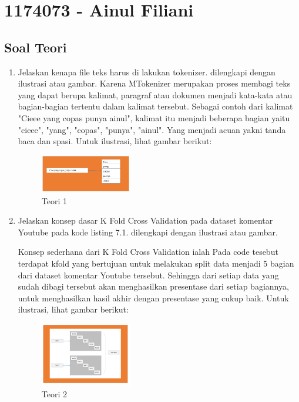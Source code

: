 \section{1174073 - Ainul Filiani}
\subsection{Soal Teori}
\begin{enumerate}

	\item Jelaskan kenapa file teks harus di lakukan tokenizer. dilengkapi dengan ilustrasi atau gambar.
	\hfill\break
	Karena MTokenizer merupakan proses membagi teks yang dapat berupa kalimat, paragraf atau dokumen menjadi kata-kata atau bagian-bagian tertentu dalam kalimat tersebut. Sebagai contoh dari kalimat "Cieee yang copas punya ainul", kalimat itu menjadi beberapa bagian yaitu "cieee", "yang", "copas", "punya", "ainul". Yang menjadi acuan yakni tanda baca dan spasi. Untuk ilustrasi, lihat gambar berikut: 

	\begin{figure}[H]
	\centering
		\includegraphics[width=4cm]{figures/1174073/tugas7/materi/teori1.PNG}
		\caption{Teori 1}
	\end{figure}

	\item Jelaskan konsep dasar K Fold Cross Validation pada dataset komentar Youtube pada kode listing 7.1. dilengkapi dengan ilustrasi atau gambar.

	

	\hfill\break
	Konsep sederhana dari K Fold Cross Validation ialah Pada code tesebut terdapat kfold yang bertujuan untuk melakukan split data menjadi 5 bagian dari dataset komentar Youtube tersebut. Sehingga dari setiap data yang sudah dibagi tersebut akan menghasilkan presentase dari setiap bagiannya, untuk menghasilkan hasil akhir dengan presentase yang cukup baik. Untuk ilustrasi, lihat gambar berikut: 

	\begin{figure}[H]
	\centering
		\includegraphics[width=4cm]{figures/1174073/tugas7/materi/teori2.PNG}
		\caption{Teori 2}
	\end{figure}
	

\end{enumerate}
